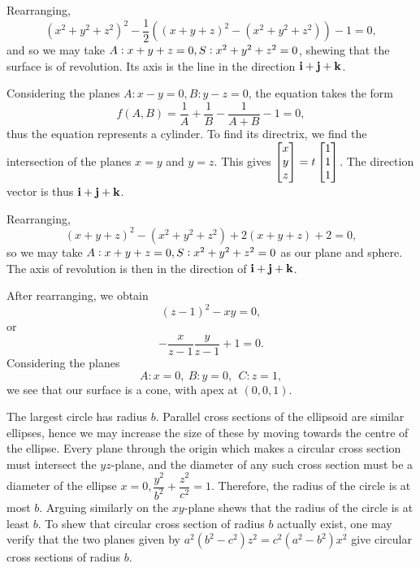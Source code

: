 \begin{Answer}{5.7}
 Rearranging,
$$ (x^2 + y^2 + z^2)^2 - \dfrac{1}{2}((x + y + z)^2 - (x^2 + y^2 + z^2)) - 1 = 0,$$
and so we may take $A: x + y + z = 0, S : x^2 + y^2 + z^2 = 0$,
shewing that the surface is of revolution. Its axis is the line in
the direction $\mathbf{ i} + \mathbf{ j} + \mathbf{ k}$.
\end{Answer}
\begin{Answer}{5.8}
 Considering the planes $A: x - y = 0, B: y - z = 0$,
the equation takes the form
$$f(A, B) = \dfrac{1}{A} + \dfrac{1}{B} - \dfrac{1}{A + B} - 1 =
0,$$thus the equation represents a cylinder. To find its directrix,
we find the intersection of the planes $x = y$ and $y = z$. This
gives $\begin{bmatrix} x \\ y \\ z \end{bmatrix} = t\begin{bmatrix} 1 \\ 1 \\ 1 \end{bmatrix}$. The direction
vector is thus $\mathbf{ i}+ \mathbf{ j} + \mathbf{ k}$.
\end{Answer}
\begin{Answer}{5.9}
 Rearranging,
$$(x + y + z)^2 - (x ^2 + y ^2 + z ^2) + 2(x + y + z) + 2 = 0,$$so we
may take $A: x + y + z = 0, S : x ^2 + y ^2 + z ^2 = 0$ as our
plane and sphere. The axis of revolution is then in the direction of
$\mathbf{ i} + \mathbf{ j} + \mathbf{ k}$.
\end{Answer}
\begin{Answer}{5.10}
 After rearranging, we obtain
$$(z - 1)^2 - xy = 0,$$or
$$-\dfrac{x}{z - 1}\dfrac{y}{z - 1} + 1 = 0.$$Considering the planes
$$A: x = 0, \ B: y = 0, \ \ C: z = 1,$$we see that our surface is
a cone, with apex at $(0,0,1)$.
\end{Answer}
\begin{Answer}{5.11}
 The largest circle has radius $b$. Parallel cross sections of
the ellipsoid are similar ellipses, hence we may increase the size
of these by moving towards the centre of the ellipse.  Every plane
through the origin which makes a circular cross section must
intersect the $yz$-plane, and the diameter of any such cross section
must be a diameter of the ellipse $x = 0, \dfrac{y^2}{b^2} +
\dfrac{z^2}{c^2} = 1.$ Therefore, the radius of the circle is at most
$b$. Arguing similarly on the $xy$-plane shews that the radius of
the circle is at least $b$. To shew that circular cross section of
radius $b$ actually exist, one may verify that the two planes given
by $a^2(b^2 - c^2)z^2 = c^2(a^2 - b^2)x^2$ give circular cross
sections of radius $b$.
\end{Answer}
